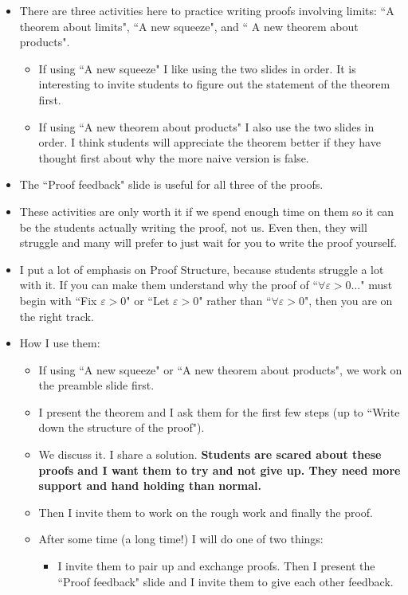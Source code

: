 \documentclass[11pt]{article}
\newcommand{\e}{\varepsilon}
\newcommand{\nl}{\hfill \vspace{-1.1\baselineskip}} %
\begin{document}
\begin{comments}
\nl
	\begin{itemize}
		\item  There are three activities here to practice writing proofs involving limits: ``A theorem about limits", ``A new squeeze", and `` A new theorem about products". 
			\begin{itemize}
				\item  If using ``A new squeeze" I like using the two slides in order.  It is interesting to invite students to figure out the statement of the theorem first.
				\item  If using ``A new theorem about products" I also use the two slides in order.  I think students will appreciate the theorem better if they have thought first about why the more naive version is false.
			\end{itemize}	
		\item The ``Proof feedback" slide is useful for all three of the proofs.	
		\item These activities are only worth it if we spend enough time on them so it can be the students actually writing the proof, not us.  Even then, they will struggle and many will prefer to just wait for you to write the proof yourself.
		\item I put a lot of emphasis on Proof Structure, because students struggle a lot with it.  If you can make them understand why the proof of ``$\forall \e>0\ldots$"  must begin with ``Fix $\e>0$" or ``Let $\e>0$" rather than ``$\forall \e>0$", then you are on the right track.
		\item How I use them:
			\begin{itemize}
				\item If using ``A new squeeze" or ``A new theorem about products", we work on the preamble slide first.
				\item  I present the theorem and I ask them for the first few steps (up to ``Write down the structure of the proof").
				\item We discuss it.  I share a solution. \textbf{Students are scared about these proofs and I want them to try and not give up.  They need more support and hand holding than normal.}
				\item Then I invite them to work on the rough work and finally the proof.
				\item After some time (a long time!) I will do one of two things:
					\begin{itemize}
						\item  I invite them to pair up and exchange proofs.  Then I present the ``Proof feedback" slide and I invite them to give each other feedback.

\end{itemize}
\end{itemize}
\end{itemize}
\end{comments}
\end{document}
